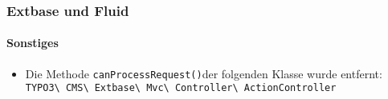 %

\begin{frame}[fragile]
	\frametitle{Extbase und Fluid}
	\framesubtitle{Sonstiges}


	\begin{itemize}
		\item Die Methode \small\texttt{canProcessRequest()}\normalsize der folgenden Klasse wurde entfernt:
			\smaller\texttt{TYPO3\textbackslash
				CMS\textbackslash
				Extbase\textbackslash
				Mvc\textbackslash
				Controller\textbackslash
				ActionController}\normalsize
	\end{itemize}

\end{frame}


